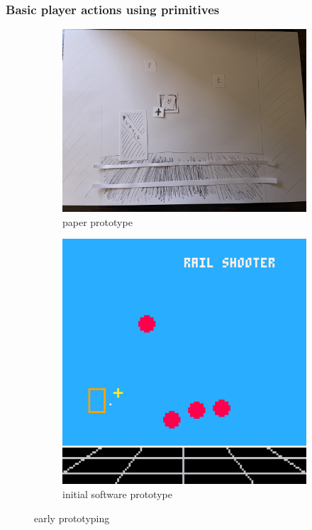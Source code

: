 \documentclass[11pt]{article}
\begin{document}
\subsubsection*{Basic player actions using primitives}

\begin{figure}[h]
\begin{subfigure}{.5\textwidth}
  \centering
  \includegraphics[width=.8\linewidth]{paper_prototype}
  \caption{paper prototype}
  \label{fig:pfig1}
\end{subfigure}
\begin{subfigure}{.5\textwidth}
  \centering
  \includegraphics[width=.8\linewidth]{prototype2d}
  \caption{initial software prototype}
  \label{fig:pfig2}
\end{subfigure}
\caption{early prototyping}
\label{fig:gameprototype}
\end{figure}
\end{document}
